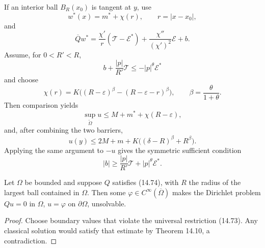 If an interior ball $B_R(x_0)$ is tangent at $y$, use
\begin{equation}
w^*(x)=m^*+\chi(r),\qquad r=|x-x_0|,
\tag{14.68}
\end{equation}
and
\begin{equation}
\overline Qw^*
=\frac{\chi'}r(\mathcal T-\mathcal E^*)
+\frac{\chi''}{(\chi')^2}\mathcal E+b.
\tag{14.69}
\end{equation}
Assume, for $0<R'<R$,
\begin{equation}
b+\frac{|p|}{R'}\mathcal T\leq-|p|^\theta\mathcal E^*
\tag{14.70}
\end{equation}
and choose
\begin{equation}
\chi(r)=K\bigl((R-\varepsilon)^\beta
-(R-\varepsilon-r)^\beta\bigr),
\qquad\beta=\frac{\theta}{1+\theta}.
\tag{14.71}
\end{equation}
Then comparison yields
\begin{equation}
\sup_{\widetilde\Omega}u
\leq M+m^*+\chi(R-\varepsilon),
\tag{14.72}
\end{equation}
and, after combining the two barriers,
\begin{equation}
u(y)\leq2M+m+K\bigl((\delta-R)^\beta+R^\beta\bigr).
\tag{14.73}
\end{equation}
Applying the same argument to $-u$ gives the symmetric sufficient condition
\begin{equation}
|b|\geq\frac{|p|}{R'}\mathcal T+|p|^\theta\mathcal E^*.
\tag{14.74}
\end{equation}

\begin{theorem}
\label{gt14-boundary-gradient-14-11}
Let $\Omega$ be bounded and suppose $Q$ satisfies (14.74), with $R$ the radius
of the largest ball contained in $\Omega$. Then some
$\varphi\in C^\infty(\overline\Omega)$ makes the Dirichlet problem
$Qu=0$ in $\Omega$, $u=\varphi$ on $\partial\Omega$, unsolvable.
\end{theorem}
\begin{proof}
\sketch Choose boundary values that violate the universal restriction (14.73).
Any classical solution would satisfy that estimate by Theorem 14.10, a
contradiction.
\end{proof}

